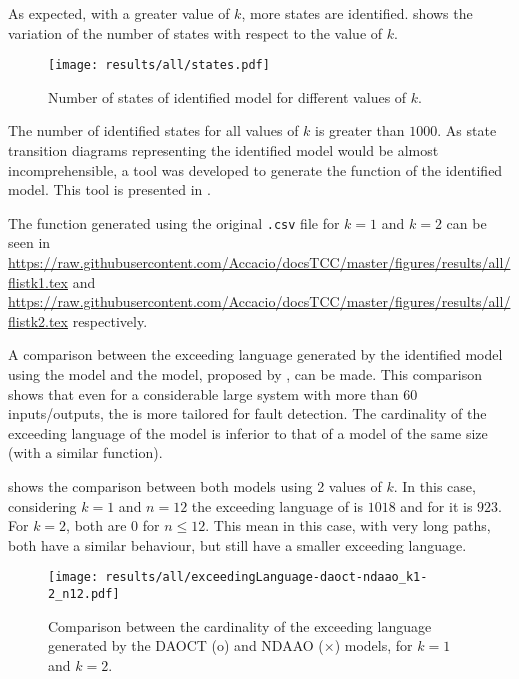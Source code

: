As expected, with a greater value of $k$, more states are identified. 
 shows the variation of the number of
states with respect to the value of $k$.
\begin{figure}[H]
  \centering
  \texttt{[image: results/all/states.pdf]}
  \caption{Number of states of identified model for different values of $k$.}
    \label{fig:statesIdentOriginal}
\end{figure}

The number of identified states for all values of $k$ is greater than $1000$. As
state transition diagrams representing the identified model would be almost
incomprehensible, a tool was developed to generate the \ffunction{} function of
the identified model. This tool is presented in .

The \ffunction{} function generated using the original \verb|.csv| file
for $k=1$ and $k=2$
can be seen in  
\url{https://raw.githubusercontent.com/Accacio/docsTCC/master/figures/results/all/flistk1.tex}
and
\url{https://raw.githubusercontent.com/Accacio/docsTCC/master/figures/results/all/flistk2.tex}
respectively.

A comparison between the exceeding language generated by the
identified model using the \DAOCT{} model and the \NDAAO{} model, proposed by
\cite{klein2005fault}, can be made. This comparison shows that even for a considerable
large system with more than 60 inputs\slash outputs, the \DAOCT{} is more
tailored for fault detection. The cardinality of the exceeding language of the
\DAOCT{} model is
inferior to that of a \NDAAO{} model of the same size (with a similar \ffunction{} function).

 shows the comparison between both models using 2 values of $k$.
In this case, considering $k=1$ and $n=12$ the
exceeding language of \NDAAO{} is $1018$ and for \DAOCT{} it is $923$. For $k=2$, both are $0$ for $n\leq12$. This mean in this case, with very
long paths, both have a similar behaviour, but \DAOCT{} still have a smaller exceeding language.
\begin{figure}[H]
  \centering
  \texttt{[image: results/all/exceedingLanguage-daoct-ndaao\_k1-2\_n12.pdf]}
  \caption[Comparison between the cardinality of the exceeding language generated by the DAOCT and
NDAAO.]{Comparison between the cardinality of the exceeding language generated by the DAOCT (o) and
NDAAO ($\times$) models, for $k=1$ and $k=2$.}
    \label{fig:daoctNdaaoOriginal}
\end{figure}

